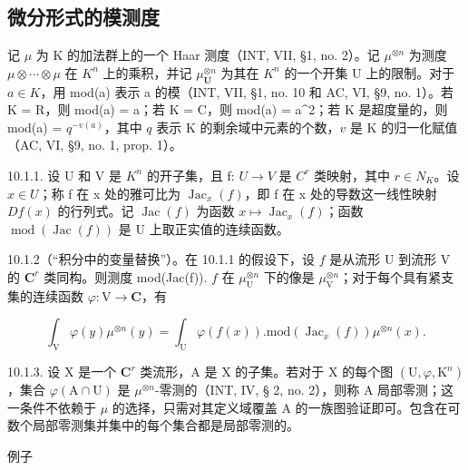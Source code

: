 \subsection{微分形式的模测度}

记 \(\mu\) 为 K 的加法群上的一个 Haar 测度（INT, VII, §1, no. 2）。记 \(\mu^{\otimes n}\) 为测度 \(\mu \otimes \cdots \otimes \mu\) 在 \(K^n\) 上的乘积，并记 \(\mu_{\mathbf{U}}^{\otimes n}\) 为其在 \(K^n\) 的一个开集 U 上的限制。对于 \(a \in K\)，用 mod(a) 表示 a 的模（INT, VII, §1, no. 10 和 AC, VI, §9, no. 1）。若 K = R，则 mod(a) = \textbar a\textbar；若 K = C，则 mod(a) = \textbar a\textbar\^{}2；若 K 是超度量的，则 mod(a) = \(q^{-v(a)}\)，其中 \(q\) 表示 K 的剩余域中元素的个数，\(v\) 是 K 的归一化赋值（AC, VI, §9, no. 1, prop. 1）。

10.1.1. 设 U 和 V 是 \(K^{n}\) 的开子集，且 f: \(U \to V\) 是 \(C^{r}\) 类映射，其中 \(r \in N_{K}\)。设 \(x \in U\)；称 f 在 x 处的雅可比为 \(\operatorname{Jac}_{x}(f)\)，即 f 在 x 处的导数这一线性映射 \(Df(x)\) 的行列式。记 \(\operatorname{Jac}(f)\) 为函数 \(x \mapsto \operatorname{Jac}_{x}(f)\)；函数 \(\operatorname{mod}(\operatorname{Jac}(f))\) 是 U 上取正实值的连续函数。

10.1.2（“积分中的变量替换”）。在 10.1.1 的假设下，设 \(f\) 是从流形 U 到流形 V 的 \(\mathbf{C}^{r}\) 类同构。则测度 mod(Jac(f)). \(f\) 在 \(\mu_{\mathrm{U}}^{\otimes n}\) 下的像是 \(\mu_{\mathrm{V}}^{\otimes n}\)；对于每个具有紧支集的连续函数 \(\varphi: \mathrm{V} \to \mathbf{C}\)，有

\[
\int_ {\mathrm{V}} \varphi (y) \mu^ {\otimes n} (y) = \int_ {\mathrm{U}} \varphi (f (x)). \mathrm{mod} (\operatorname{Jac} _ {x} (f)) \mu^ {\otimes n} (x).\tag{1}
\]

10.1.3. 设 X 是一个 \(\mathbf{C}^r\) 类流形，A 是 X 的子集。若对于 X 的每个图 \((\mathrm{U},\varphi ,\mathrm{K}^n)\)，集合 \(\varphi (\mathrm{A}\cap \mathrm{U})\) 是 \(\mu^{\otimes n}\)-零测的（INT, IV, § 2, no. 2），则称 A 局部零测；这一条件不依赖于 \(\mu\) 的选择，只需对其定义域覆盖 A 的一族图验证即可。包含在可数个局部零测集并集中的每个集合都是局部零测的。

例子

